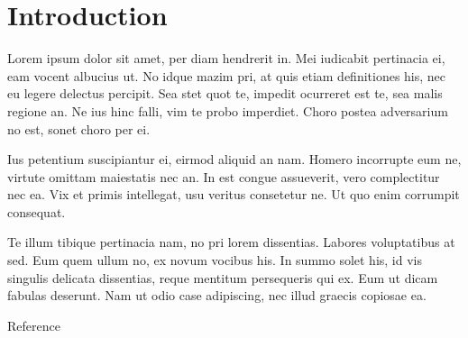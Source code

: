 \section{Introduction}
Lorem ipsum dolor sit amet, per diam hendrerit in. Mei iudicabit pertinacia ei, eam vocent albucius ut. No idque mazim pri, at quis etiam definitiones his, nec eu legere delectus percipit. Sea stet quot te, impedit ocurreret est te, sea malis regione an. Ne ius hinc falli, vim te probo imperdiet. Choro postea adversarium no est, sonet choro per ei.

Ius petentium suscipiantur ei, eirmod aliquid an nam. Homero incorrupte eum ne, virtute omittam maiestatis nec an. In est congue assueverit, vero complectitur nec ea. Vix et primis intellegat, usu veritus consetetur ne. Ut quo enim corrumpit consequat.

Te illum tibique pertinacia nam, no pri lorem dissentias. Labores voluptatibus at sed. Eum quem ullum no, ex novum vocibus his. In summo solet his, id vis singulis delicata dissentias, reque mentitum persequeris qui ex. Eum ut dicam fabulas deserunt. Nam ut odio case adipiscing, nec illud graecis copiosae ea.

Reference \cite{Domingos:2012:FUT:2347736.2347755}